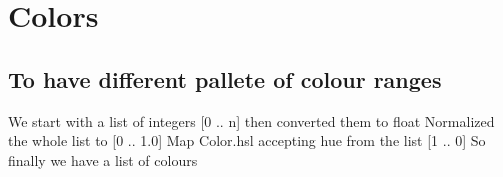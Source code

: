 \hypertarget{colors}{%
\section{Colors}\label{colors}}

\hypertarget{to-have-different-pallete-of-colour-ranges}{%
\subsection{To have different pallete of colour
ranges}\label{to-have-different-pallete-of-colour-ranges}}

\begin{Shaded}
\begin{Highlighting}[]
  \OperatorTok{=}  \OperatorTok{|}  \OperatorTok{|} 
\end{Highlighting}
\end{Shaded}

We start with a list of integers {[}0 .. n{]} then converted them to
float Normalized the whole list to {[}0 .. 1.0{]} Map Color.hsl
accepting hue from the list {[}1 .. 0{]} So finally we have a list of
colours


